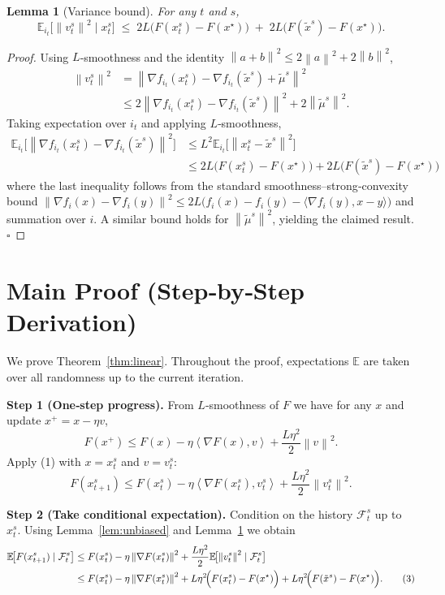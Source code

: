 \documentclass{article}
\newtheorem{lemma}{Lemma}
\newcommand{\E}{\mathbb{E}}
\newcommand{\norm}[1]{\left\|#1\right\|}
\newcommand{\inner}[2]{\left\langle #1,#2 \right\rangle}
\begin{document}
\begin{lemma}[Variance bound]\label{lem:variance}
For any $t$ and $s$,
\[
\E_{i_t}\!\bigl[\norm{v_{t}^{s}}^{2}\mid x_{t}^{s}\bigr]\;\le\;
2L\bigl(F(x_{t}^{s})-F(x^{\star})\bigr)
\;+\;
2L\bigl(F(\tilde{x}^{s})-F(x^{\star})\bigr).
\]
\end{lemma}
\begin{proof}
Using $L$‑smoothness and the identity $\norm{a+b}^{2}\le2\norm{a}^{2}+2\norm{b}^{2}$,
\[
\begin{aligned}
\norm{v_{t}^{s}}^{2}
&= \norm{\nabla f_{i_t}(x_{t}^{s})-\nabla f_{i_t}(\tilde{x}^{s})+\tilde{\mu}^{s}}^{2}\\
&\le 2\norm{\nabla f_{i_t}(x_{t}^{s})-\nabla f_{i_t}(\tilde{x}^{s})}^{2}
    +2\norm{\tilde{\mu}^{s}}^{2}.
\end{aligned}
\]
Taking expectation over $i_t$ and applying $L$‑smoothness,
\[
\begin{aligned}
\E_{i_t}\!\bigl[\norm{\nabla f_{i_t}(x_{t}^{s})-\nabla f_{i_t}(\tilde{x}^{s})}^{2}\bigr]
&\le L^{2}\E_{i_t}\!\bigl[\norm{x_{t}^{s}-\tilde{x}^{s}}^{2}\bigr]  \\
&\le 2L\bigl(F(x_{t}^{s})-F(x^{\star})\bigr)
   +2L\bigl(F(\tilde{x}^{s})-F(x^{\star})\bigr)
\end{aligned}
\]
where the last inequality follows from the standard smoothness–strong‑convexity bound
$\norm{\nabla f_i(x)-\nabla f_i(y)}^{2}\le 2L\bigl(f_i(x)-f_i(y)-\langle\nabla f_i(y),x-y\rangle\bigr)$
and summation over $i$. A similar bound holds for $\norm{\tilde{\mu}^{s}}^{2}$, yielding the claimed result. \(\square\)
\end{proof}

\section*{Main Proof (Step‑by‑Step Derivation)}
We prove Theorem~\ref{thm:linear}. Throughout the proof, expectations $\E$ are taken over all randomness up to the current iteration.

\noindent\textbf{Step 1 (One‑step progress).}  
From $L$‑smoothness of $F$ we have for any $x$ and update $x^{+}=x-\eta v$,
\[
F(x^{+})\le F(x)-\eta\inner{\nabla F(x)}{v}
               +\frac{L\eta^{2}}{2}\norm{v}^{2}. \tag{1}
\]
Apply (1) with $x=x_{t}^{s}$ and $v=v_{t}^{s}$:
\[
F(x_{t+1}^{s})\le F(x_{t}^{s})-\eta\inner{\nabla F(x_{t}^{s})}{v_{t}^{s}}
               +\frac{L\eta^{2}}{2}\norm{v_{t}^{s}}^{2}. \tag{2}
\]

\noindent\textbf{Step 2 (Take conditional expectation).}  
Condition on the history $\mathcal{F}_{t}^{s}$ up to $x_{t}^{s}$. Using Lemma~\ref{lem:unbiased} and Lemma~\ref{lem:variance} we obtain
\[
\begin{aligned}
\E\!\bigl[F(x_{t+1}^{s})\mid\mathcal{F}_{t}^{s}\bigr]
&\le F(x_{t}^{s})-\eta\norm{\nabla F(x_{t}^{s})}^{2}
   +\frac{L\eta^{2}}{2}\E\!\bigl[\norm{v_{t}^{s}}^{2}\mid\mathcal{F}_{t}^{s}\bigr] \\
&\le F(x_{t}^{s})-\eta\norm{\nabla F(x_{t}^{s})}^{2}
   +L\eta^{2}\!\Bigl(F(x_{t}^{s})-F(x^{\star})\Bigr)
   +L\eta^{2}\!\Bigl(F(\tilde{x}^{s})-F(x^{\star})\Bigr). \tag{3}
\end{aligned}
\]
\end{document}
